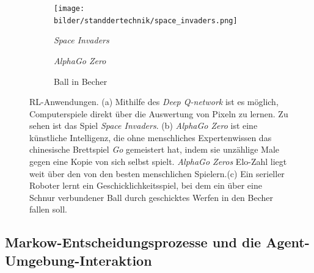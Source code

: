 \newsavebox{\imgbox}
\begin{figure}[htb!]
\centering
\begin{subfigure}[t]{0.32\textwidth}
	\centering
	\texttt{[image: bilder/standdertechnik/space\_invaders.png]}
	\caption{\textit{Space Invaders}~\cite{MKS+15}}
\end{subfigure}
\begin{subfigure}[t]{0.32\textwidth}
	\centering{}
	\caption{\textit{AlphaGo Zero}~\cite{SSS+17}}
\end{subfigure}
\begin{subfigure}[t]{0.32\textwidth}
	\centering{}
	\caption{Ball in Becher~\cite{NU11}}
\end{subfigure}
\caption[Anwendungen des Reinforcement Learning]{RL-Anwendungen. (a) Mithilfe des \textit{Deep Q-network} ist es möglich, Computerspiele direkt über die Auswertung von Pixeln zu lernen. Zu sehen ist das Spiel \textit{Space Invaders}. (b) \textit{AlphaGo Zero} ist eine künstliche Intelligenz, die ohne menschliches Expertenwissen das chinesische Brettspiel \textit{Go} gemeistert hat, indem sie unzählige Male gegen eine Kopie von sich selbst spielt. \textit{AlphaGo Zeros} Elo-Zahl liegt weit über den von den besten menschlichen Spielern.\footnotemark (c) Ein serieller Roboter lernt ein Geschicklichkeitsspiel, bei dem ein über eine Schnur verbundener Ball durch geschicktes Werfen in den Becher fallen soll.}
\label{fig:rl_beispiele}
\end{figure}




\pagebreak
\subsection{Markow-Entscheidungsprozesse und die Agent-Umgebung-Interaktion}
\label{subsec:MEP}



